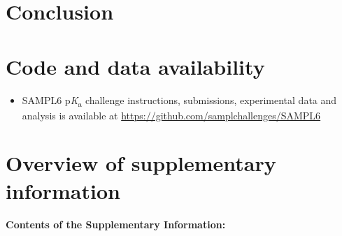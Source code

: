 \documentclass[9pt,lineno,final]{elife}
\newcommand{\pKa}{p\textit{K}\textsubscript{a}}
\begin{document}
\section{Conclusion}


\section{Code and data availability} \label{Code-and-Data-Availability}
\begin{minipage}{15cm}
\begin{itemize}

\item SAMPL6 \pKa{} challenge instructions, submissions, experimental data and analysis is available at  \href{https://github.com/samplchallenges/SAMPL6}{https://github.com/samplchallenges/SAMPL6}

\end{itemize}
\end{minipage}


\section{Overview of supplementary information}

\paragraph{Contents of the Supplementary Information:}
\end{document}
